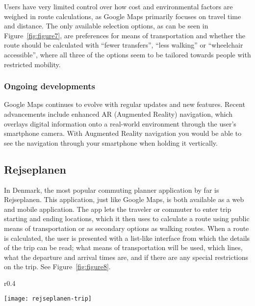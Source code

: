 Users have very limited control over how cost and environmental factors are weighed in route calculations, as Google
Maps primarily focuses on travel time and distance.
The only available selection options, as can be seen in Figure~\ref{fig:figure7}, are preferences for means of
transportation and whether the route should be calculated with ``fewer transfers'', ``less walking'' or ``wheelchair
accessible'', where all three of the options seem to be tailored towards people with restricted mobility.

\subsubsection{Ongoing developments}

Google Maps continues to evolve with regular updates and new features.
Recent advancements include enhanced AR (Augmented Reality) navigation, which overlays digital information onto
a real-world environment through the user's smartphone camera.
With Augmented Reality navigation you would be able to see the navigation through your smartphone when holding it
vertically. \cite{googlemapsAR2023}

\subsection{Rejseplanen}\label{subsec:rejseplanen}

In Denmark, the most popular commuting planner application by far is Rejseplanen.
This application, just like Google Maps, is both available as a web and mobile application.
The app lets the traveler or commuter to enter trip starting and ending locations, which it then uses to calculate a
route using public means of transportation or as secondary options as walking routes.
When a route is calculated, the user is presented with a list-like interface from which the details of the trip can be
read; what means of transportation will be used, which lines, what the departure and arrival times are, and if there are
any special restrictions on the trip.
See Figure~\ref{fig:figure8}.

\begin{wrapfigure}{r}{0.4\textwidth}
    \begin{center}
        \texttt{[image: rejseplanen-trip]}
    \end{center}
    \caption{Rejseplanen mobile UI trip planner.}
    \label{fig:figure8}
\end{wrapfigure}

